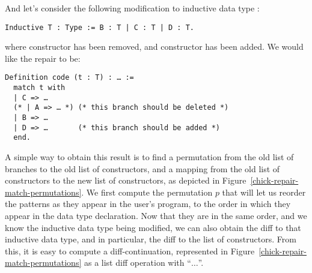 \noindent%
%
And let's consider the following modification to inductive data type
:

\begin{verbatim}
Inductive T : Type := B : T | C : T | D : T.
\end{verbatim}

\noindent%
%
where constructor  has been removed, and constructor 
has been added.  We would like the repair to be:

\begin{verbatim}
Definition code (t : T) : … :=
  match t with
  | C => …
  (* | A => … *) (* this branch should be deleted *)
  | B => …
  | D => …       (* this branch should be added *)
  end.
\end{verbatim}

A simple way to obtain this result is to find a permutation from the old list of
branches to the old list of constructors, and a mapping from the old list of
constructors to the new list of constructors, as depicted in
Figure~\ref{chick-repair-match-permutations}.  We first compute the permutation
$p$ that will let us reorder the patterns as they appear in the user's program,
to the order in which they appear in the data type declaration.  Now that they
are in the same order, and we know the inductive data type being modified, we
can also obtain the diff to that inductive data type, and in particular, the
diff to the list of constructors.  From this, it is easy to compute a
diff-continuation, represented in Figure~\ref{chick-repair-match-permutations}
as a list diff operation with ``$…$''.

